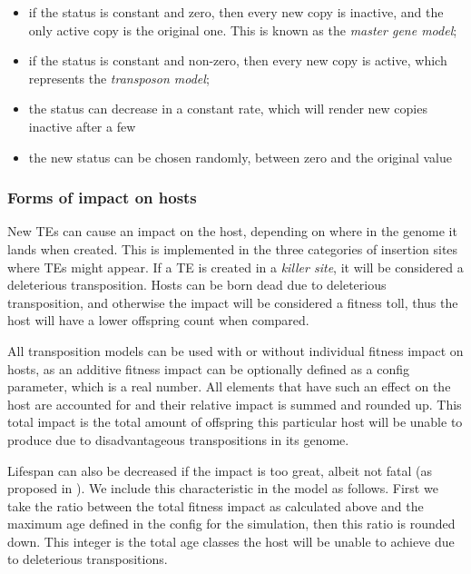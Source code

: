 \documentclass[10pt]{article}
\begin{document}
\begin{itemize}
\item if the status is constant and zero, then every new copy is
  inactive, and the only active copy is the original one. This is
  known as the \emph{master gene model};

\item if the status is constant and non-zero, then every new copy is
  active, which represents the \emph{transposon model};

\item the status can decrease in a constant rate, which will render
  new copies inactive after a few 

\item the new status can be chosen randomly, between zero and the
  original value
\end{itemize}

\subsubsection{Forms of impact on hosts}

New TEs can cause an impact on the host, depending on where in the
genome it lands when created. This is implemented in the three
categories of insertion sites where TEs might appear. If a TE is
created in a \emph{killer site}, it will be considered a deleterious
transposition. Hosts can be born dead due to deleterious
transposition, and otherwise the impact will be considered a fitness
toll, thus the host will have a lower offspring count when compared.

All transposition models can be used with or without individual
fitness impact on hosts, as an additive fitness impact can be
optionally defined as a config parameter, which is a real number. All
elements that have such an effect on the host are accounted for and
their relative impact is summed and rounded up. This total impact is
the total amount of offspring this particular host will be unable to
produce due to disadvantageous transpositions in its genome.

Lifespan can also be decreased if the impact is too great, albeit not
fatal (as proposed in \cite{rouzic2005}). We include this
characteristic in the model as follows. First we take the ratio
between the total fitness impact as calculated above and the maximum
age defined in the config for the simulation, then this ratio is
rounded down. This integer is the total age classes the host will be
unable to achieve due to deleterious transpositions.
\end{document}
